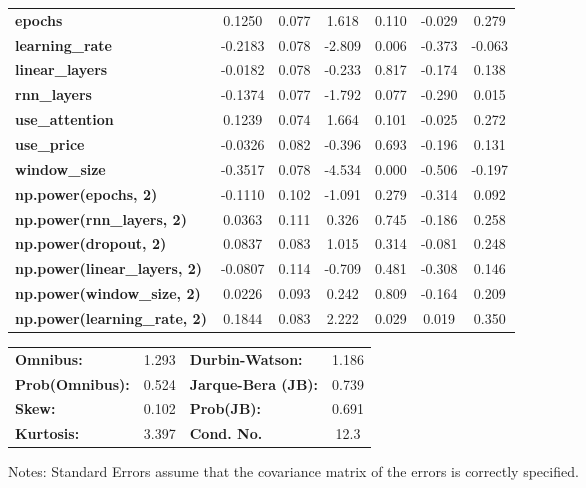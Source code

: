 \begin{center}
\begin{tabular}{lcccccc}
\textbf{epochs}                            &       0.1250  &        0.077     &     1.618  &         0.110        &       -0.029    &        0.279     \\
\textbf{learning\_rate}                    &      -0.2183  &        0.078     &    -2.809  &         0.006        &       -0.373    &       -0.063     \\
\textbf{linear\_layers}                    &      -0.0182  &        0.078     &    -0.233  &         0.817        &       -0.174    &        0.138     \\
\textbf{rnn\_layers}                       &      -0.1374  &        0.077     &    -1.792  &         0.077        &       -0.290    &        0.015     \\
\textbf{use\_attention}                    &       0.1239  &        0.074     &     1.664  &         0.101        &       -0.025    &        0.272     \\
\textbf{use\_price}                        &      -0.0326  &        0.082     &    -0.396  &         0.693        &       -0.196    &        0.131     \\
\textbf{window\_size}                      &      -0.3517  &        0.078     &    -4.534  &         0.000        &       -0.506    &       -0.197     \\
\textbf{np.power(epochs, 2)}               &      -0.1110  &        0.102     &    -1.091  &         0.279        &       -0.314    &        0.092     \\
\textbf{np.power(rnn\_layers, 2)}          &       0.0363  &        0.111     &     0.326  &         0.745        &       -0.186    &        0.258     \\
\textbf{np.power(dropout, 2)}              &       0.0837  &        0.083     &     1.015  &         0.314        &       -0.081    &        0.248     \\
\textbf{np.power(linear\_layers, 2)}       &      -0.0807  &        0.114     &    -0.709  &         0.481        &       -0.308    &        0.146     \\
\textbf{np.power(window\_size, 2)}         &       0.0226  &        0.093     &     0.242  &         0.809        &       -0.164    &        0.209     \\
\textbf{np.power(learning\_rate, 2)}       &       0.1844  &        0.083     &     2.222  &         0.029        &        0.019    &        0.350     \\
\bottomrule
\end{tabular}
\begin{tabular}{lclc}
\textbf{Omnibus:}       &  1.293 & \textbf{  Durbin-Watson:     } &    1.186  \\
\textbf{Prob(Omnibus):} &  0.524 & \textbf{  Jarque-Bera (JB):  } &    0.739  \\
\textbf{Skew:}          &  0.102 & \textbf{  Prob(JB):          } &    0.691  \\
\textbf{Kurtosis:}      &  3.397 & \textbf{  Cond. No.          } &     12.3  \\
\bottomrule
\end{tabular}
\end{center}

Notes: \newline
 [1] Standard Errors assume that the covariance matrix of the errors is correctly specified.